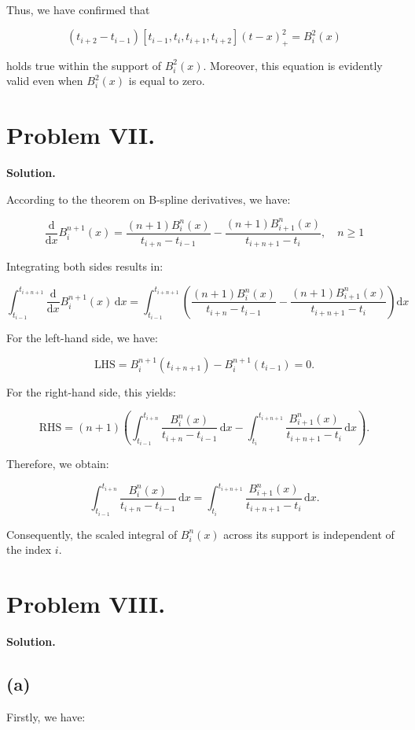 \documentclass[a4paper]{article}
\renewcommand{\qed}{\hfill \boxed{\mathbb{Q.E.D.}}}
\begin{document}
Thus, we have confirmed that

\[
(t_{i+2} - t_{i-1})[t_{i-1}, t_i, t_{i+1}, t_{i+2}](t - x)_+^2 = B_i^2(x)
\]

holds true within the support of \( B_i^2(x) \). Moreover, this equation is evidently valid even when \( B_i^2(x) \) is equal to zero.

\qed

\section*{Problem VII.}

\textbf{Solution.}

According to the theorem on B-spline derivatives, we have:

\[
\frac{\text{d}}{\text{d}x} B_i^{n+1}(x) = \frac{(n+1) B_i^n(x)}{t_{i+n} - t_{i-1}} - \frac{(n+1) B_{i+1}^n(x)}{t_{i+n+1} - t_i}, \quad n \geq 1
\]

Integrating both sides results in:

\[
\int_{t_{i-1}}^{t_{i+n+1}} \frac{\text{d}}{\text{d}x} B_i^{n+1}(x) \, \text{d}x = \int_{t_{i-1}}^{t_{i+n+1}} \left( \frac{(n+1) B_i^n(x)}{t_{i+n} - t_{i-1}} - \frac{(n+1) B_{i+1}^n(x)}{t_{i+n+1} - t_i} \right) \text{d}x
\]

For the left-hand side, we have:

\[
\text{LHS} = B_i^{n+1}(t_{i+n+1}) - B_i^{n+1}(t_{i-1}) = 0.
\]

For the right-hand side, this yields:

\[
\text{RHS} = (n+1) \left( \int_{t_{i-1}}^{t_{i+n}} \frac{B_i^n(x)}{t_{i+n} - t_{i-1}} \, \text{d}x - \int_{t_i}^{t_{i+n+1}} \frac{B_{i+1}^n(x)}{t_{i+n+1} - t_i} \, \text{d}x \right).
\]

Therefore, we obtain:

\[
\int_{t_{i-1}}^{t_{i+n}} \frac{B_i^n(x)}{t_{i+n} - t_{i-1}} \, \text{d}x = \int_{t_i}^{t_{i+n+1}} \frac{B_{i+1}^n(x)}{t_{i+n+1} - t_i} \, \text{d}x.
\]

Consequently, the scaled integral of \( B_i^n(x) \) across its support is independent of the index \( i \).


\section*{Problem VIII.}

\textbf{Solution.}

\subsection*{(a)}
Firstly, we have:
\end{document}
